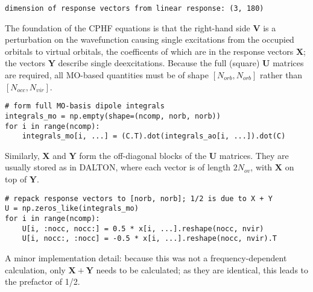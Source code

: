 \begin{verbatim}
dimension of response vectors from linear response: (3, 180)
\end{verbatim}
The foundation of the CPHF equations is that the right-hand side \(\mathbf{V}\) is a perturbation on the wavefunction causing single excitations from the occupied orbitals to virtual orbitals, the coefficents of which are in the response vectors \(\mathbf{X}\); the vectors \(\mathbf{Y}\) describe single deexcitations. Because the full (square) \(\mathbf{U}\) matrices are required, all MO-based quantities must be of shape \([N_{orb}, N_{orb}]\) rather than \([N_{occ}, N_{vir}]\).
\begin{verbatim}
# form full MO-basis dipole integrals
integrals_mo = np.empty(shape=(ncomp, norb, norb))
for i in range(ncomp):
    integrals_mo[i, ...] = (C.T).dot(integrals_ao[i, ...]).dot(C)
\end{verbatim}
Similarly, \(\mathbf{X}\) and \(\mathbf{Y}\) form the off-diagonal blocks of the \(\mathbf{U}\) matrices. They are usually stored as in DALTON, where each vector is of length \(2N_{ov}\), with \(\mathbf{X}\) on top of \(\mathbf{Y}\).
\begin{verbatim}
# repack response vectors to [norb, norb]; 1/2 is due to X + Y
U = np.zeros_like(integrals_mo)
for i in range(ncomp):
    U[i, :nocc, nocc:] = 0.5 * x[i, ...].reshape(nocc, nvir)
    U[i, nocc:, :nocc] = -0.5 * x[i, ...].reshape(nocc, nvir).T
\end{verbatim}
A minor implementation detail: because this was not a frequency-dependent calculation, only \(\mathbf{X}+\mathbf{Y}\) needs to be calculated; as they are identical, this leads to the prefactor of 1/2.
